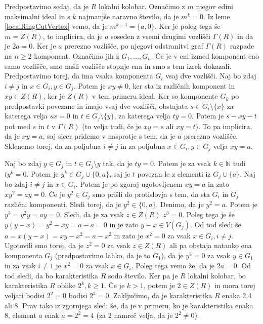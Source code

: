 \documentclass[a4paper, 12pt]{amsart}
\theoremstyle{definition} %
\theoremstyle{plain} %
\newcommand{\N}{\mathbb N}
\begin{document}
Predpostavimo sedaj, da je $R$ lokalni kolobar. Označimo z $m$ njegov edini maksimalni ideal in s $k$ najmanjše naravno število, da je $m^k = 0$. Iz leme \ref{localRingCutVertex} vemo, da je $m^{k-1} =  \{a,0\}$. Ker je poleg tega še $m = Z(R)$, to implicira, da je $a$ soseden z vsemi drugimi vozlišči $\Gamma(R)$ in da je $2a = 0$. Ker je $a$ prerezno vozlišče, po njegovi odstranitvi graf $\Gamma(R)$ razpade na $n\ge 2$ komponent. Označimo jih z $G_1,\dots, G_n$. Če je v eni izmed komponent eno samo vozlišče, smo našli vozlišče stopnje ena in smo s tem izrek dokazali. Predpostavimo torej, da ima vsaka komponenta $G_i$ vsaj dve vozlišči. Naj bo zdaj $i\neq j$ in $x\in G_i, y\in G_j$. Potem je $xy \neq 0$, ker sta iz različnih komponent in $xy \in Z(R)$, ker je $Z(R)$ v tem primeru ideal. Ker so komponente $G_k$ po predpostavki povezane in imajo vsaj dve vozlišči, obstajata $s\in G_i\setminus\{x\}$  za katerega velja $sx = 0$ in $t\in G_j \setminus \{y\}$, za katerega velja $ty = 0$. Potem je $s-xy -t$ pot med $s$ in $t$ v $\Gamma(R)$ (to velja tudi, če je $xy = s$ ali $xy = t$). To pa implicira, da je $xy = a$, saj sicer pridemo v nasprotje s tem, da je $a$ prerezno vozlišče. Sklenemo torej, da za poljubna $i\neq j$ in za poljubna $x\in G_i, y\in G_j$ velja $xy = a$.

Naj bo zdaj $y\in G_j$ in $t\in G_j\setminus{y}$ tak, da je $ty=0$. Potem je za vsak $k\in \N$ tudi $ty^k = 0$. Potem je $y^k \in G_j \cup\{0,a\}$, saj je $t$ povezan le z elementi iz $G_j \cup \{a\}$. Naj bo zdaj $i \neq j  $ in $x\in G_i$. Potem je po zgoraj ugotovljenem $xy=a$ in zato $xy^2 = ay = 0$. Če je $y^2 \in G_j$ smo prišli do protislovja s tem, da sta $G_i $ in $G_j$ različni komponenti. Sledi torej, da je $y^2  \in \{0,a\}$. Denimo, da je $y^2 = a$. Potem je $y^3 = y^2 y = ay = 0$. Sledi, da je za vsak $z\in Z(R)$ $z^3 = 0$. Poleg tega je še $y(y-x) = y^2 - xy = a -a = 0$ in je zato $y-x \in V(G_j)$. Od tod sledi še $a = x(y-x) = xy - x^2 = a - x^2$ in zato je $x^2 = 0$ za vsak $x\in G_i, i\neq j$. Ugotovili smo torej, da je $z^2 = 0$ za vsak $z\in Z(R)$ ali pa obstaja natanko ena komponenta $G_j$ (predpostavimo lahko, da je to $G_1$), da je $y^3 = 0$ za vsak $y\in G_1$ in za vsak $i\neq 1$ je $x^2 = 0$ za vsak $x\in G_i$. Poleg tega vemo že, da je $2a = 0$. Od tod sledi, da bo karakteristika $R$ sodo število. Ker pa je $R$ lokalni kolobar, bo karakteristika  $R$ oblike $2^k, k \ge 1$. Če je $k > 1$, potem je $2\in Z(R)$ in mora torej veljati bodisi $2^2 = 0$ bodisi $2^3 = 0$. Zaključimo, da je karakteristika $R$ enaka 2,4 ali 8. Prav tako iz zgornjega sledi še, da je v primeru, ko je karakteristika enaka 8, element $a$ enak $a = 2^2 = 4$ (za 2 namreč velja, da je $2^2 \neq 0$).
\end{document}
